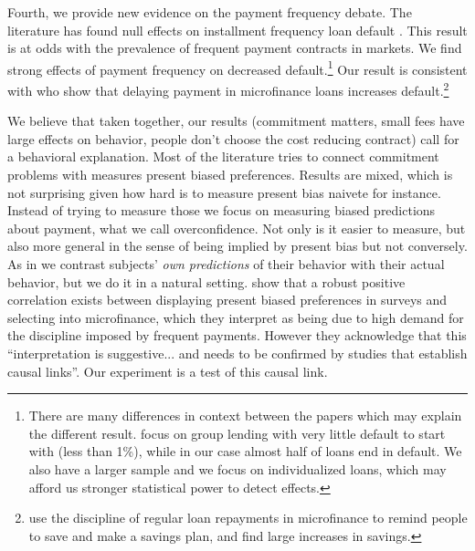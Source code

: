 \documentclass[oneside,11pt]{article}
\begin{document}

Fourth, we provide new evidence on the payment frequency debate. The literature has found null effects on installment frequency loan default \cite{Pande}. This result is at odds with the prevalence of frequent payment contracts in markets. We find strong effects of payment frequency on decreased default.\footnote{There are many differences in context between the papers which may explain the different result. \cite{Pande} focus on group lending with very little default to start with (less than 1\%), while in our case almost half of loans end in default. We also have a larger sample and we focus on individualized loans, which may afford us stronger statistical power to detect effects.} Our result is consistent with \cite{Field} who show that delaying payment in microfinance loans increases default.\footnote{\cite{Craig} use the discipline of regular loan repayments in microfinance to remind people to save and make a savings plan, and find large increases in savings.} 

We believe that taken together, our results (commitment matters, small fees have large effects on behavior, people don't choose the cost reducing contract) call for a behavioral explanation. Most of the literature tries to connect commitment problems with measures present biased preferences. Results are mixed, which is not surprising given how hard is to measure present bias naivete for instance. Instead of trying to measure those we focus on measuring biased predictions about payment, what we call overconfidence. Not only is it easier to measure, but also more general in the sense of being implied by present bias but not conversely. As in \cite{Rabin2018} we contrast subjects' \textit{own predictions} of their behavior with their actual behavior, but we do it in a natural setting. \cite{Murdoch} show that a robust positive correlation exists between displaying present biased preferences in surveys and selecting into microfinance, which they interpret as being due to high demand for the discipline imposed by frequent payments. However they acknowledge that this ``interpretation is suggestive... and needs to be confirmed by studies that establish causal links''. Our experiment is a test of this causal link.
\end{document}
